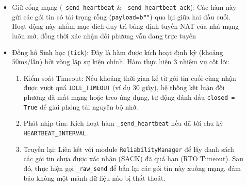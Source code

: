 \begin{itemize}
    \item Giữ cổng mạng (\texttt{\_send\_heartbeat} \& \texttt{\_send\_heartbeat\_ack}): Các hàm này gửi các gói tin có tải trọng rỗng (\texttt{payload=b""}) qua lại giữa hai đầu cuối. Hoạt động này nhằm mục đích duy trì bảng định tuyến NAT của nhà mạng luôn mở, đồng thời xác nhận đối phương vẫn đang trực tuyến
    \item Đồng hồ Sinh học (\texttt{tick}): Đây là hàm được kích hoạt định kỳ (khoảng 50ms/lần) bởi vòng lặp sự kiện chính. Hàm thực hiện 3 nhiệm vụ cốt lõi:
    \begin{enumerate}
        \item Kiểm soát Timeout: Nếu khoảng thời gian kể từ gói tin cuối cùng nhận được vượt quá \texttt{IDLE\_TIMEOUT} (ví dụ 30 giây), hệ thống kết luận đối phương đã mất mạng hoặc treo ứng dụng, tự động đánh dấu \texttt{closed = True} để giải phóng tài nguyên bộ nhớ.
        \item Phát nhịp tim: Kích hoạt hàm \texttt{\_send\_heartbeat} nếu đã tới chu kỳ \texttt{HEARTBEAT\_INTERVAL}.
        \item Truyền lại: Liên kết với module \texttt{ReliabilityManager} để lấy danh sách các gói tin chưa được xác nhận (SACK) đã quá hạn (RTO Timeout). Sau đó, thực hiện gọi \texttt{\_raw\_send} để bắn lại các gói tin này xuống mạng, đảm bảo không một mảnh dữ liệu nào bị thất thoát.
    \end{enumerate}
\end{itemize}

